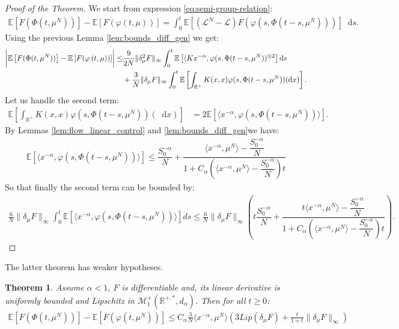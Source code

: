 \documentclass[11pt,a4paper]{article}
\newcommand{\RR}{\mathbb{R}}
\newcommand{\MC}{\mathcal{M}}
\newcommand{\LC}{\mathcal{L}}
\newcommand{\E}[1]{\mathbb{E}\left[#1\right]}
\newcommand{\dd}{\mathop{}\!\mathrm{d}}
\newtheorem{theorem}{Theorem}[section]
\begin{document}
\begin{proof}[Proof of the Theorem]
 We start from expression \eqref{eq:semi-group-relation}:
 \begin{align*}
\E{F(\Phi(t,\mu^N))} - \E{F(\varphi\left(t,\mu\right))} = \int_0^t \E{\left(\LC^N - \LC\right)F(\varphi(s,\Phi(t-s,\mu^N)))}\dd s.
\end{align*}
Using the previous Lemma \ref{lem:bounds_diff_gen} we get:
\begin{align*}
    \left|\vphantom{\dfrac{A}{A}} \E{F(\Phi(t,\mu^N))} - \E{F(\varphi\left(t,\mu\right))}\right| \leq&  \frac{9}{2N}\|\delta_\mu^2 F\|_{\infty}\int_0^t \E{ \langle Kx^{-\alpha} , \varphi(s,\Phi(t-s,\mu^N))^{\otimes 2}}\dd s\\
    &+ \frac{3}{N}\|\delta_\mu F\|_{\infty}\int_0^t\E{\int_{\RR^+} K(x,x)\varphi(s,\Phi(t-s,\mu^N))(\dd x)}.
\end{align*}
Let us handle the second term:
\begin{align*}
    \E{\int_{\RR^+} K(x,x)\varphi(s,\Phi(t-s,\mu^N))(\dd x)} 
    &=  2\E{\langle x^{-\alpha}, \varphi(s,\Phi(t-s,\mu^N))\rangle}.
\end{align*}
By Lemmas \ref{lem:flow_linear_control}  and \ref{lem:bounds_diff_gen}we have:
\begin{align*}
    \E{\langle x^{-\alpha}, \varphi(s,\Phi(t-s,\mu^N))\rangle} \leq \dfrac{S_0^{-\alpha}}{N} + \dfrac{\langle x^{-\alpha},\mu^N \rangle - \dfrac{S_0^{-\alpha}}{N}}{1 + C_\alpha \left(\langle x^{-\alpha},\mu^N \rangle - \dfrac{S_0^{-\alpha}}{N}\right)t}
\end{align*}
So that finally the second term can be bounded by:
\begin{multline*}
    \frac{6}{N}\|\delta_\mu F\|_{\infty}\int_0^t\E{\langle x^{-\alpha}, \varphi(s,\Phi(t-s,\mu^N))\rangle}ds \leq \frac{6}{N}\|\delta_\mu F\|_{\infty} \left( t\dfrac{S_0^{-\alpha}}{N} + \dfrac{t\langle x^{-\alpha},\mu^N \rangle - \dfrac{S_0^{-\alpha}}{N}}{1 + C_\alpha \left(\langle x^{-\alpha},\mu^N \rangle - \dfrac{S_0^{-\alpha}}{N}\right)t}\right).
\end{multline*}
\end{proof}


The latter theorem has weaker hypotheses.
\begin{theorem}
    Assume $\alpha < 1$, $F$ is differentiable and, its linear derivative is uniformly bounded and Lipschitz in $\MC^{+}_{1}\left(\RR^{+,*},d_\alpha\right)$. Then for all $t\geq 0$:
    \begin{align*}
        \E{F(\Phi(t,\mu^N))} - \E{F(\varphi\left(t,\mu^N\right))} \leq C_\alpha\frac{3}{N}\langle x^{-\alpha},\mu^N \rangle \left(3 Lip\left(\delta_\mu F\right) + \frac{t}{1 + t}\|\delta_\mu F\|_{\infty}\right)
    \end{align*}
\end{theorem}
\end{document}
